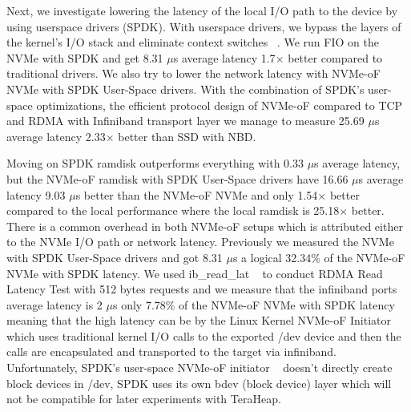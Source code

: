 Next, we investigate lowering the latency of the local I/O path to the device by using userspace drivers (SPDK). With userspace drivers, we bypass the layers of the kernel's I/O stack and eliminate context switches ~\cite{spdk}. We run FIO on the NVMe with SPDK and get 8.31 $\mu$s average latency 1.7$\times$ better compared to traditional drivers. We also try to lower
the network latency with NVMe-oF NVMe with SPDK User-Space drivers. With the combination of SPDK’s user-space optimizations, the efficient protocol design of NVMe-oF compared to TCP and RDMA with Infiniband transport layer we manage to measure 25.69 $\mu$s average latency 2.33$\times$ better than SSD with NBD. 

Moving on SPDK ramdisk outperforms everything with 0.33 $\mu$s average latency, but the NVMe-oF ramdisk with SPDK User-Space drivers have 16.66 $\mu$s average latency 9.03 $\mu$s better than the NVMe-oF NVMe and only 1.54$\times$ better compared to the local performance where the local ramdisk is 25.18$\times$ better. There is a common overhead in both NVMe-oF setups which is attributed either to the NVMe I/O path or network latency. Previously we measured the NVMe with SPDK User-Space drivers and got 8.31 $\mu$s a logical 32.34\% of the NVMe-oF NVMe with SPDK latency. We used ib\_read\_lat ~\cite{perftest} to conduct RDMA Read Latency Test with 512 bytes requests and we measure that the infiniband ports average latency is 2 $\mu$s only 7.78\% of the NVMe-oF NVMe with SPDK latency meaning that the high latency can be by the Linux Kernel NVMe-oF Initiator which uses traditional kernel I/O calls to the exported /dev device and then the calls are encapsulated and transported to the target via infiniband. Unfortunately, SPDK's user-space NVMe-oF initiator ~\cite{spdk} doesn't directly create block devices in /dev, SPDK uses its own bdev (block device) layer which will not be
compatible for later experiments with TeraHeap. 

